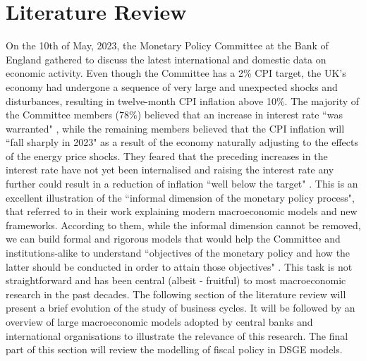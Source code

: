 \section{Literature Review}

On the 10th of May, 2023, the Monetary Policy Committee at the Bank of England gathered to discuss the latest international and domestic data on economic activity. Even though the Committee has a 2\% CPI target, the UK's economy had undergone a sequence of very large and unexpected shocks and disturbances, resulting in twelve-month CPI inflation above 10\%. The majority of the Committee members (78\%) believed that an increase in interest rate ``was warranted" \parencite[4]{boe_2023_monetary}, while the remaining members believed that the CPI inflation will ``fall sharply in 2023" \parencite[5]{boe_2023_monetary} as a result of the economy naturally adjusting to the effects of the energy price shocks. They feared that the preceding increases in the interest rate have not yet been internalised and raising the interest rate any further could result in a reduction of inflation ``well below the target" \parencite[5]{boe_2023_monetary}. This is an excellent illustration of the ``informal dimension of the monetary policy process", that \parencite[26]{gals_2007_macroeconomic} referred to in their work explaining modern macroeconomic models and new frameworks. According to them, while the informal dimension cannot be removed, we can build formal and rigorous models that would help the Committee and institutions-alike to understand ``objectives of the monetary policy and how the latter should be conducted in order to attain those objectives" \parencite[2]{jordigal_2015_monetary}. This task is not straightforward and has been central (albeit - fruitful) to most macroeconomic research in the past decades. The following section of the literature review will present a brief evolution of the study of business cycles. It will be followed by an overview of large macroeconomic models adopted by central banks and international organisations to illustrate the relevance of this research. The final part of this section will review the modelling of fiscal policy in DSGE models.

